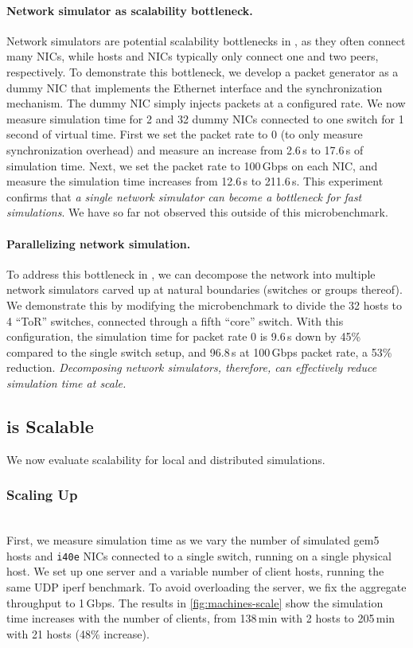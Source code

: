 \paragraph{Network simulator as scalability bottleneck.}
Network simulators are potential scalability bottlenecks in \sysname,
as they often connect many NICs, while hosts and NICs typically only connect
one and two peers, respectively.
%
To demonstrate this bottleneck, we develop a packet generator as a dummy NIC
that implements the \sysname Ethernet interface and the synchronization
mechanism.
%
The dummy NIC simply injects packets at a configured rate.
%
We now measure simulation time for 2 and 32 dummy NICs connected to
one switch for 1 second of virtual time.
%
First we set the packet rate to 0 (to only measure synchronization overhead) and
measure an increase from 2.6\,s to 17.6\,s of simulation time.
%
Next, we set the packet rate to 100\,Gbps on each NIC, and measure the
simulation time increases from 12.6\,s to 211.6\,s.
%
This experiment confirms that \emph{a single network simulator can become a
bottleneck for fast simulations}.
%
We have so far not observed this outside of this microbenchmark.

\paragraph{Parallelizing network simulation.}
To address this bottleneck in \sysname, we can decompose the network into
multiple network simulators carved up at natural boundaries (\eg switches or
groups thereof).
%
We demonstrate this by modifying the microbenchmark to divide the 32
hosts to 4 ``ToR'' switches, connected through a fifth ``core''
switch.
%
With this configuration, the simulation time for packet rate 0 is 9.6\,s down by
45\% compared to the single switch setup, and 96.8\,s at 100\,Gbps packet rate,
a 53\% reduction.
%
\emph{Decomposing network simulators, therefore, can effectively reduce
simulation time at scale.}


\subsection{\sysname is Scalable}
\label{ssec:eval:scalability}
We now evaluate scalability for local and distributed simulations.

\subsubsection{Scaling Up}\hfill\\
First, we measure simulation time as we vary the number of simulated
gem5 hosts and \texttt{i40e} NICs connected to a single switch,
running on a single physical host.
%
We set up one server and a variable number of client hosts, running
the same UDP iperf benchmark.
%
To avoid overloading the server, we fix the aggregate throughput to
1\,Gbps.
%
The results in \autoref{fig:machines-scale} show the simulation time
increases with the number of clients, from 138\,min with 2
hosts to 205\,min with 21 hosts (48\% increase).

